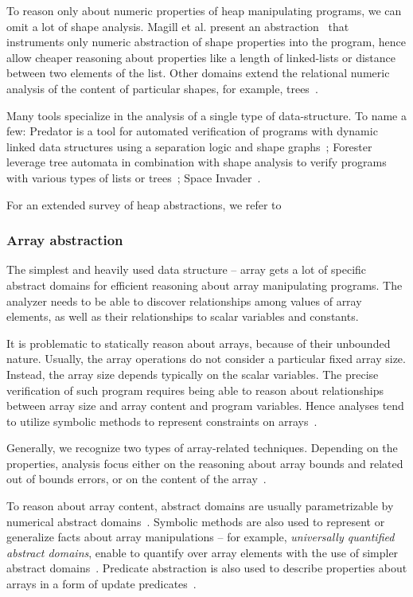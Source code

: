 To reason only about numeric properties of heap manipulating programs, we can omit a lot of shape analysis. Magill et al. present an abstraction~\cite{Magill2010} that instruments only numeric abstraction of shape properties into the program, hence allow cheaper reasoning about properties like a length of linked-lists or distance between two elements of the list. Other domains extend the relational numeric analysis of the content of particular shapes, for example, trees~\cite{Journault2019}.

Many tools specialize in the analysis of a single type of data-structure. To name a few: Predator is a tool for automated verification of programs with dynamic linked data structures using a separation logic and shape graphs~\cite{Dudka2012}; Forester leverage tree automata in combination with shape analysis to verify programs with various types of lists or trees~\cite{Holik2015}; Space Invader~\cite{Yang2008}.


For an extended survey of heap abstractions, we refer to~\cite{Kanvar2016}

\subsubsection{Array abstraction}

The simplest and heavily used data structure -- array gets a lot of specific
abstract domains for efficient reasoning about array manipulating programs. The
analyzer needs to be able to discover relationships among values of array
elements, as well as their relationships to scalar variables and constants.

It is problematic to statically reason about arrays, because of their unbounded
nature.  Usually, the array operations do not consider a particular fixed array
size. Instead, the array size depends typically on the scalar variables. The
precise verification of such program requires being able to reason about
relationships between array size and array content and program variables. Hence
analyses tend to utilize symbolic methods to represent constraints on
arrays~\cite{Gopan2005}.

Generally, we recognize two types of array-related techniques. Depending on the
properties, analysis focus either on the reasoning about array bounds and
related out of bounds errors, or on the content of the array~\cite{Halbwachs2008}.

To reason about array content, abstract domains are usually parametrizable by
numerical abstract domains~\cite{Cousot2011p}. Symbolic methods are also used
to represent or generalize facts about array manipulations -- for example,
\emph{universally quantified abstract domains}, enable to quantify over array
elements with the use of simpler abstract domains~\cite{Gulwani2008}.
Predicate abstraction is also used to describe properties about arrays in a
form of update predicates~\cite{Kovacs2009}.

